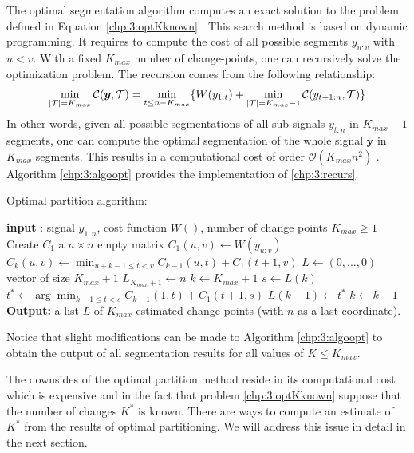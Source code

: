 The optimal segmentation algorithm computes an exact solution to the problem defined in Equation \eqref{chp:3:optKknown} \citep{Bai2003}. This search method is based on dynamic programming. It requires to compute the cost of all possible segments $y_{u:v}$ with $u<v$.  With a fixed $K_{max}$ number of change-points, one can recursively solve the optimization problem. The recursion comes from the following relationship: 
\begin{equation}\label{chp:3:recurs}
\min_{\lvert{\mathcal T}\rvert = K_{max}}\mathcal{C}(\bm y, {\mathcal T}) = \min_{t \leq n-K_{max}}\{W(y_{1:t})+\min_{\lvert{\mathcal T}\rvert = K_{max}-1}\mathcal{C}(y_{t+1:n},{\mathcal T})\} 
\end{equation}
In other words, given all possible segmentations of all sub-signals $y_{t:n}$ in $K_{max}-1$ segments, one can compute the optimal segmentation of the whole signal $\bm y$ in $K_{max}$ segments. This results in a computational cost of order $\mathcal{O}(K_{max}n^2)$ \citep{haynes2017}. Algorithm \ref{chp:3:algoopt} provides the implementation of \eqref{chp:3:recurs}. 

\begin{algorithm}[ht]
\caption{Optimal partition algorithm:}\label{chp:3:algoopt}
\begin{algorithmic}

\State \textbf{input} : signal $y_{1:n}$, cost function $W()$, number of change points $K_{max} \geq 1$
\State Create $C_1$ a $n\times n$ empty matrix
  \State $C_1(u,v) \gets W(y_{u:v})$
\EndFor
{}
      \State $C_k(u,v) \gets \min_{u+k-1 \leq t < v} C_{k-1}(u,t) + C_1(t+1,v)$ 
    \EndFor
  \EndFor
\EndIf
\State $L \gets (0,...,0)$ vector of size $K_{max}+1$
\State $L_{K_{max}+1} \gets n$
\State $k \gets K_{max}+1$
  \State $s \gets L(k)$
  \State $t^* \gets \arg\min_{k-1\leq t < s}C_{k-1}(1,t)+C_1(t+1,s)$
  \State $L(k-1) \gets t^*$
  \State $k \gets k-1$
\EndWhile
\State \textbf{Output:} a list $L$ of $K_{max}$ estimated change points (with $n$ as a last coordinate).
\end{algorithmic}
\end{algorithm} 

Notice that slight modifications can be made to Algorithm \ref{chp:3:algoopt} to obtain the output of all segmentation results for all values of $K\leq K_{max}$. 

The downsides of the optimal partition method reside in its computational cost which is expensive and in the fact that problem \eqref{chp:3:optKknown} suppose that the number of changes $K^*$ is known. There are ways to compute an estimate of $K^*$ from the results of optimal partitioning. We will address this issue in detail in the next section. 

